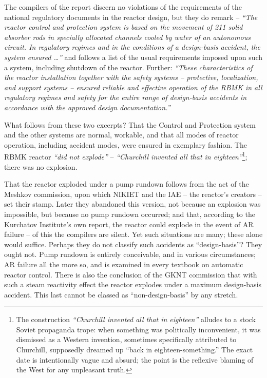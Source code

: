 \documentclass[openright]{bookest}
\begin{document}
The compilers of the report discern no violations of the requirements of the national regulatory documents in the reactor design, but they do remark -- \textit{``The reactor control and protection system is based on the movement of \num{211} solid absorber rods in specially allocated channels cooled by water of an autonomous circuit. In regulatory regimes and in the conditions of a design-basis accident, the system ensured \ldots''} and follows a list of the usual requirements imposed upon such a system, including shutdown of the reactor. Further: \textit{``These characteristics of the reactor installation together with the safety systems -- protective, localization, and support systems -- ensured reliable and effective operation of the RBMK in all regulatory regimes and safety for the entire range of design-basis accidents in accordance with the approved design documentation.''}

What follows from these two excerpts? That the Control and Protection system and the other systems are normal, workable, and that all modes of reactor operation, including accident modes, were ensured in exemplary fashion. The RBMK reactor \textit{``did not explode''} -- \textit{``Churchill invented all that in eighteen''}\footnote{The construction \textit{``Churchill invented all that in eighteen''} alludes to a stock Soviet propaganda trope: when something was politically inconvenient, it was dismissed as a Western invention, sometimes specifically attributed to Churchill, supposedly dreamed up ``back in eighteen-something.'' The exact date is intentionally vague and absurd; the point is the reflexive blaming of the West for any unpleasant truth.}; there was no explosion.


That the reactor exploded under a pump rundown follows from the act of the Meshkov commission, upon which NIKIET and the IAE -- the reactor's creators -- set their stamp. Later they abandoned this version, not because an explosion was impossible, but because no pump rundown occurred; and that, according to the Kurchatov Institute's own report, the reactor could explode in the event of AR failure -- of this the compilers are silent. Yet such situations are many; these alone would suffice. Perhaps they do not classify such accidents as ``design-basis''? They ought not. Pump rundown is entirely conceivable, and in various circumstances; AR failure all the more so, and is examined in every textbook on automatic reactor control. There is also the conclusion of the GKNT commission that with such a steam reactivity effect the reactor explodes under a maximum design-basis accident. This last cannot be classed as ``non-design-basis'' by any stretch.
\end{document}
